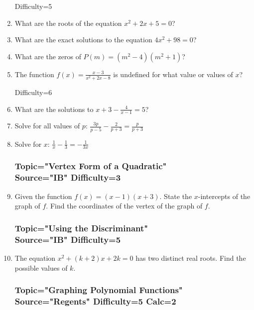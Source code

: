 \documentclass[12pt, oneside]{article}
\begin{document}
\begin{enumerate}
Difficulty=5
\item What are the roots of the equation $x^2+ 2x+5 =0$? %

\item What are the exact solutions to the equation $4x^2+98=0$? %

\item What are the zeros of $P(m) = (m^2 - 4)(m^2+ 1)$? %

\item The function $\displaystyle f(x)=\frac{x-3}{x^2+2x-8}$ is undefined for what value or values of $x$? %

Difficulty=6
\item What are the solutions to $\displaystyle x+3- \frac{4}{x-1} =5$? %

\item Solve for all values of $p$: $\displaystyle \frac{3p}{p-5} - \frac{2}{p+3} =\frac{p}{p+3}$ %

\item Solve for $x$: $\displaystyle \frac{1}{x} - \frac{1}{3} =-\frac{1}{3x}$ %

\subsubsection*{Topic="Vertex Form of a Quadratic"\\
Source="IB" 
Difficulty=3}

\item Given the function $f(x)=(x-1)(x+3)$. State the $x$-intercepts of the graph of $f$. Find the coordinates of the vertex of the graph of $f$.


\subsubsection*{Topic="Using the Discriminant"\\
Source="IB" 
Difficulty=5}

\item The equation $x^2+(k+2)x+2k=0$ has two distinct real roots. Find the possible values of $k$.

\subsubsection*{Topic="Graphing Polynomial Functions"\\
Source="Regents" 
Difficulty=5 Calc=2}


\end{enumerate}
\end{document}
